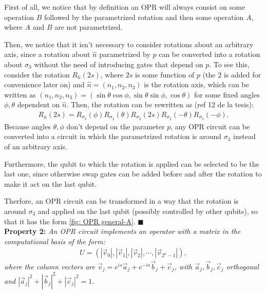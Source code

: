First of all, we notice that by definition an OPR
will always consist on some operation $B$ followed by the parametrized rotation 
and then some operation $A$, where $A$ and $B$ are not parametrized. 

Then, we notice that it isn't necessary to consider rotations
about an arbitrary axis, since a rotation about $\hat{n}$ parametrized by $p$ can
be converted into a rotation about $\sigma_3$ without the need of introducing gates that depend on $p$.
To see this, consider the rotation $R_{\hat{n}}(2s)$, where $2s$ is some function of $p$ (the $2$ is added for convenience later on) and $\hat{n} = (n_1,n_2,n_3)$ is the rotation axis,
 which can be written as $(n_1,n_2,n_3) = (\sin \theta \cos \phi , \sin \theta\sin \phi, \cos \theta)$ for some fixed angles $\phi, \theta$ dependent on $\hat{n}$. 
 Then, the rotation can be rewritten as (ref 12 de la tesis):
\begin{eqnarray}
R_{\hat{n}}(2s) = R_{\sigma_3}(\phi) R_{\sigma_2}(\theta) R_{\sigma_3}(2s) R_{\sigma_2}(-\theta) R_{\sigma_3}(-\phi).
\end{eqnarray}
Because angles $\theta, \phi$ don't depend on the parameter $p$, 
any OPR circuit can be converted into a circuit in which the parametrized rotation is around $\sigma_3$ instead of an arbitrary axis.

Furthermore, the qubit to which the rotation is applied can be selected to be the last one,
since otherwise  swap gates can be added before and after the rotation to make it act on the last qubit.

Therfore, an OPR circuit can be transformed in a way that the rotation is around $\sigma_3$ and applied on the last qubit 
(possibly controlled by other qubits), 
so that it has the form \ref{fig: OPR general-A}. $\blacksquare$ \\

\textbf{Property 2:} \textit{An OPR circuit implements an operator with a matrix in the computational basis of the form:}
\begin{eqnarray}
U = (|\vec{v}_0|, |\vec{v}_1|, |\vec{v}_2|, \cdots, |\vec{v}_{2^n-1}|),
\end{eqnarray}
\textit{where the column vectors are $\vec{v}_j = e^{is} \vec{a}_j + e^{-is} \vec{b}_j + \vec{c}_j$,
with $\vec{a}_j ,\vec{b}_j, \vec{c}_j$ orthogonal and $|\vec{a}_j|^2 + |\vec{b}_j|^2 + |\vec{c}_j|^2 = 1$.}\\

